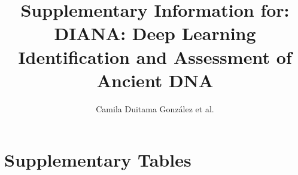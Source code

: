 \documentclass[12pt]{article}
\title{Supplementary Information for: \\ \textbf{DIANA: Deep Learning Identification and Assessment of Ancient DNA}}
\author{Camila Duitama González et al.}
\date{}
\begin{document}
\maketitle

\tableofcontents
\clearpage

\listoffigures
\clearpage

\listoftables
\clearpage

\renewcommand{\figurename}{Supplementary Figure}
\renewcommand{\tablename}{Supplementary Table}
\setcounter{figure}{0}
\setcounter{table}{0}

\section{Supplementary Tables}



\begin{table}[p]
    
\end{table}

\begin{table}[p]
    
\end{table}



\begin{table}[p]
    
\end{table}



\begin{table}[p]
    
\end{table}

\clearpage

\end{document}
